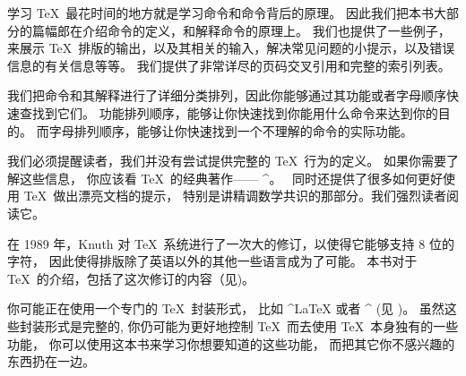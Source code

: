 学习 \TeX\ 最花时间的地方就是学习命令和命令背后的原理。
因此我们把本书大部分的篇幅郎在介绍命令的定义，和解释命令的原理上。
我们也提供了一些例子，来展示 \TeX\ 排版的输出，以及其相关的输入，解决常见问题的小提示，以及错误信息的有关信息等等。
我们提供了非常详尽的页码交叉引用和完整的索引列表。

我们把命令和其解释进行了详细分类排列，因此你能够通过其功能或者字母顺序快速查找到它们。
功能排列顺序，能够让你快速找到你能用什么命令来达到你的目的。
而字母排列顺序，能够让你快速找到一个不理解的命令的实际功能。

我们必须提醒读者，我们并没有尝试提供完整的 \TeX\ 行为的定义。
如果你需要了解这些信息， 你应该看 \TeX\ 的经典著作—— ^{\texbook}。
\texbook\ 同时还提供了很多如何更好使用 \TeX\ 做出漂亮文档的提示，
特别是讲精调数学共识的那部分。我们强烈读者阅读它。

在 1989 年，Knuth 对 \TeX\ 系统进行了一次大的修订，以使得它能够支持 $8$ 位的字符，
因此使得排版除了英语以外的其他一些语言成为了可能。
本书对于 \TeX\ 的介绍，包括了这次修订的内容（见)。

你可能正在使用一个专门的 \TeX\ 封装形式，
比如 ^{\LaTeX} 或者 ^{\AMSTeX} (见 )。
虽然这些封装形式是完整的, 你仍可能为更好地控制 \TeX\ 而去使用 \TeX\ 本身独有的一些功能，
你可以使用这本书来学习你想要知道的这些功能，
而把其它你不感兴趣的东西扔在一边。

